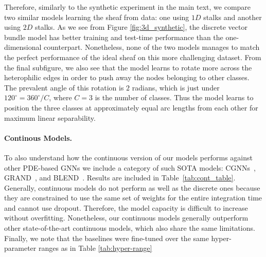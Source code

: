 \documentclass{article}
\begin{document}
Therefore, similarly to the synthetic experiment in the main text, we compare two similar models learning the sheaf from data: one using $1D$ stalks and another using $2D$ stalks. As we see from Figure \ref{fig:3d_synthetic}, the discrete vector bundle model has better training and test-time performance than the one-dimensional counterpart. Nonetheless, none of the two models manages to match the perfect performance of the ideal sheaf on this more challenging dataset. From the final subfigure, we also see that the model learns to rotate more across the heterophilic edges in order to push away the nodes belonging to other classes. The prevalent angle of this rotation is $2$ radians, which is just under $120^{\circ} = 360^{\circ} / C$, where $C=3$ is the number of classes. Thus the model learns to position the three classes at approximately equal arc lengths from each other for maximum linear separability.

\paragraph{Continous Models.} To also understand how the continuous version of our models performs against other PDE-based GNNs we include a category of such SOTA models:
CGNNs~\citep{xhonneux2020continuous}, GRAND~\citep{chamberlain2021grand}, and BLEND~\citep{chamberlain2021blend}. Results are included in Table~\ref{tab:cont_table}. Generally, continuous models do not perform as well as the discrete ones because they are constrained to use the same set of weights for the entire integration time and cannot use dropout. Therefore, the model capacity is difficult to increase without overfitting. Nonetheless, our continuous models generally outperform other state-of-the-art continuous models, which also share the same limitations. Finally, we note that the baselines were fine-tuned over the same hyper-parameter ranges as in Table \ref{tab:hyper-range}
\end{document}
